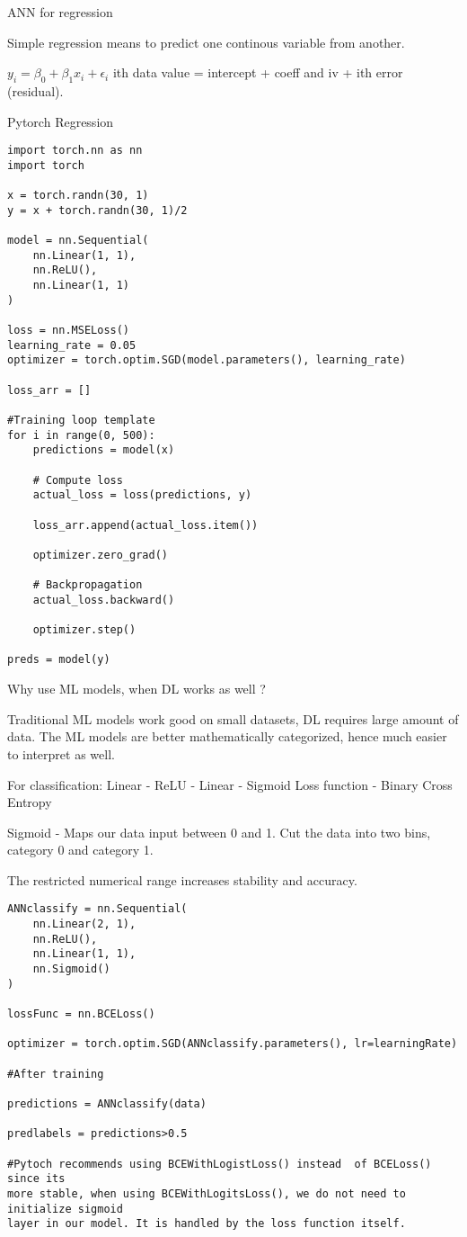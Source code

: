 \documentclass[30pt, a4]{article}
\begin{document}
ANN for regression

Simple regression means to predict one continous variable from another.

{
\Large
$y_i = \beta_0 + \beta_1 x_i + \epsilon_i$    
}
ith data value = intercept + coeff and iv + ith error (residual).

Pytorch Regression 
\begin{lstlisting}
import torch.nn as nn
import torch

x = torch.randn(30, 1)
y = x + torch.randn(30, 1)/2

model = nn.Sequential(
    nn.Linear(1, 1),
    nn.ReLU(),
    nn.Linear(1, 1)
)

loss = nn.MSELoss()
learning_rate = 0.05
optimizer = torch.optim.SGD(model.parameters(), learning_rate)

loss_arr = []

#Training loop template
for i in range(0, 500):
    predictions = model(x)

    # Compute loss
    actual_loss = loss(predictions, y)
    
    loss_arr.append(actual_loss.item())
    
    optimizer.zero_grad()
    
    # Backpropagation
    actual_loss.backward()
    
    optimizer.step()

preds = model(y)

\end{lstlisting}
Why use ML models, when DL works as well ?

Traditional ML models work good on small datasets, DL requires large amount of
data. The ML models are better mathematically categorized, hence much easier
to interpret as well.

For classification: Linear - ReLU - Linear - Sigmoid
Loss function - Binary Cross Entropy

Sigmoid - Maps our data input between 0 and 1. Cut the data into two bins,
category 0 and category 1.

The restricted numerical range increases stability and accuracy.

\begin{lstlisting}
ANNclassify = nn.Sequential(
    nn.Linear(2, 1),
    nn.ReLU(),
    nn.Linear(1, 1),
    nn.Sigmoid()
)

lossFunc = nn.BCELoss()

optimizer = torch.optim.SGD(ANNclassify.parameters(), lr=learningRate)

#After training

predictions = ANNclassify(data)

predlabels = predictions>0.5

#Pytoch recommends using BCEWithLogistLoss() instead  of BCELoss() since its
more stable, when using BCEWithLogitsLoss(), we do not need to initialize sigmoid
layer in our model. It is handled by the loss function itself.
\end{lstlisting}
\end{document}
